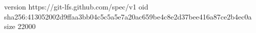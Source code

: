 version https://git-lfs.github.com/spec/v1
oid sha256:413052002d9ffaa3bb04c5c5a5e7a20ac659be4c8e2d37bee416a87ce2b4ec0a
size 22000
